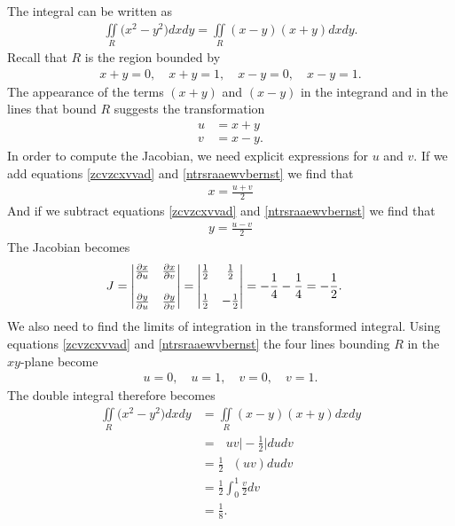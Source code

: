 \documentclass{article}
\begin{document}
\item %
The integral can be written as
\begin{align*}
  \iint\limits_R \big(x^2 - y^2\big) dxdy =  \iint\limits_R (x - y)(x+y) dxdy.
\end{align*}
Recall that $R$ is the region bounded by
\begin{align*}
  x+y = 0, \quad x+y = 1, \quad x-y=0, \quad x-y=1.
\end{align*}
The appearance of the terms $(x+y)$ and $(x - y)$ in the integrand and in the lines that bound $R$ suggests the transformation 
\begin{align}
  u & = x+y  \label{zcvzcxvvad}\\
  v &= x - y \label{ntrsraaewvbernst}.
\end{align}
In order to compute the Jacobian, we need explicit expressions for $u$ and $v$. If we add  equations \ref{zcvzcxvvad} and \ref{ntrsraaewvbernst} we find that 
\begin{align*}   x = \frac{u+v}{2}   \end{align*}
And if we subtract equations \ref{zcvzcxvvad} and \ref{ntrsraaewvbernst} we find that
\begin{align*}   y = \frac{u-v}{2}   \end{align*}
The Jacobian becomes
\begin{align*}   J &=  
  \begin{vmatrix}
   \frac{\partial x}{\partial u} &  \frac{\partial x}{\partial v} \\ \\
   \frac{\partial y}{\partial u} & \frac{\partial y}{\partial v} \\
  \end{vmatrix}
  =     \begin{vmatrix}
 \frac{1}{2} &  \frac{1}{2} \\ \\
   \frac{1}{2} & -\frac{1}{2} \\
  \end{vmatrix}
  = - \frac{1}{4}- \frac{1}{4} = - \frac{1}{2}.
 \end{align*}
We also need to find the limits of  integration in the transformed integral. Using equations \ref{zcvzcxvvad} and \ref{ntrsraaewvbernst} the four lines bounding $R$ in the $xy$-plane become 
\begin{align*}
  u = 0, \quad u = 1, \quad v=0, \quad v=1.
\end{align*}
The double integral therefore becomes
\begin{align*}
  \iint\limits_R \big(x^2 - y^2\big) dxdy 
  &=  \iint\limits_R (x - y)(x+y) dxdy \\
  &=    \mathop{\int_0^1 \! \int_0^1} uv \Bigg|-\frac{1}{2} \Bigg| dudv \\
  &=     \frac{1}{2}\mathop{\int_0^1 \! \int_0^1} (uv) dudv \\
  &=     \frac{1}{2}\int_0^1 \frac{v}{2} dv \\
  &=   \frac{1}{8}.
\end{align*}
\end{document}
